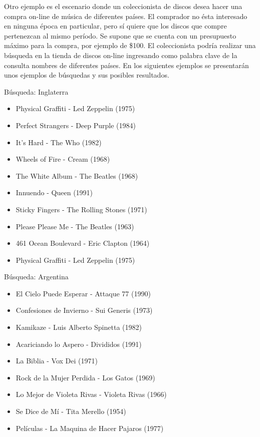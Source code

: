 Otro ejemplo es el escenario donde un coleccionista de discos desea hacer una compra on-line de música de diferentes países. El comprador no ésta interesado en ninguna época en particular, pero sí quiere que los discos que compre pertenezcan al mismo período. Se supone que se cuenta con un presupuesto máximo para la compra, por ejemplo de \$100. El coleccionista podría realizar una búsqueda en la tienda de discos on-line ingresando como palabra clave de la consulta nombres de diferentes países. En los siguientes ejemplos se presentarán unos ejemplos de búsquedas y sus posibles resultados.

\begin{mybox}{Búsqueda: Inglaterra}
\begin{itemize}
	\item {\scriptsize Physical Graffiti - Led Zeppelin (1975)}
	\item {\scriptsize Perfect Strangers - Deep Purple (1984)}
	\item {\scriptsize It's Hard - The Who  (1982)}
	\item {\scriptsize Wheels of Fire - Cream (1968)}
	\item {\scriptsize The White Album - The Beatles (1968)}
	\item {\scriptsize Innuendo - Queen (1991)}
	\item {\scriptsize Sticky Fingers - The Rolling Stones (1971)}
	\item {\scriptsize Please Please Me - The Beatles (1963)}
	\item {\scriptsize 461 Ocean Boulevard - Eric Clapton (1964)}
	\item {\scriptsize Physical Graffiti - Led Zeppelin (1975)}
\end{itemize}
\end{mybox}

\begin{mybox}{Búsqueda: Argentina}
\begin{itemize}
	\item {\scriptsize El Cielo Puede Esperar - Attaque 77 (1990)}
	\item {\scriptsize Confesiones de Invierno - Sui Generis (1973)}
	\item {\scriptsize Kamikaze - Luis Alberto Spinetta (1982)}
	\item {\scriptsize Acariciando lo Aspero - Divididos (1991)}
	\item {\scriptsize La Biblia - Vox Dei (1971)}
	\item {\scriptsize Rock de la Mujer Perdida - Los Gatos (1969)}
	\item {\scriptsize Lo Mejor de Violeta Rivas - Violeta Rivas (1966)}
	\item {\scriptsize Se Dice de Mí - Tita Merello (1954)}
	\item {\scriptsize Películas - La Maquina de Hacer Pajaros (1977)}
\end{itemize}
\end{mybox}

